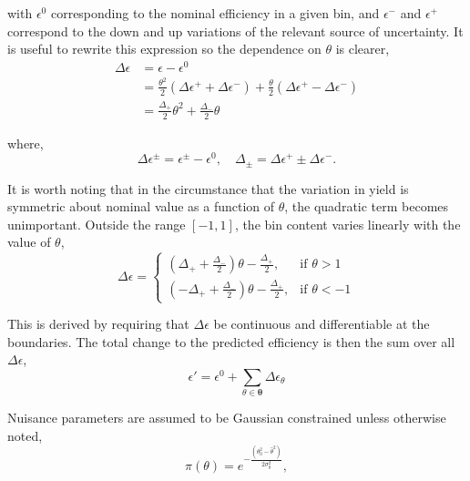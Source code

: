 with $\epsilon^{0}$ corresponding to the nominal efficiency in a given
bin, and $\epsilon^{-}$ and $\epsilon^{+}$ correspond to the down and up
variations of the relevant source of uncertainty.  It is useful to
rewrite this expression so the dependence on $\theta$ is clearer,
\begin{align}
    \Delta\epsilon &= \epsilon - \epsilon^{0} \\
     &= \frac{\theta^{2}}{2}(\Delta\epsilon^{+} + \Delta\epsilon^{-}) 
     + \frac{\theta}{2}(\Delta\epsilon^{+} - \Delta\epsilon^{-}) \\
     &= \frac{\Delta_{+}}{2}\theta^{2}  + \frac{\Delta_{-}}{2}\theta
\end{align}

where,
\begin{equation}
    \Delta\epsilon^{\pm} = \epsilon^{\pm} - \epsilon^{0}, \quad \Delta_{\pm} = \Delta\epsilon^{+} \pm \Delta\epsilon^{-} .
\end{equation}

It is worth noting that in the circumstance that the variation in yield
is symmetric about nominal value as a function of $\theta$, the
quadratic term becomes unimportant.  Outside the range $[-1, 1]$, the
bin content varies linearly with the value of $\theta$,
\begin{equation}
    \Delta\epsilon = 
    \begin{cases}
            (\Delta_{+} + \frac{\Delta_{-}}{2})\theta - \frac{\Delta_{+}}{2},
            & \text{if } \theta > 1 \\
            (-\Delta_{+} + \frac{\Delta_{-}}{2})\theta - \frac{\Delta_{+}}{2},
            & \text{if } \theta < -1
    \end{cases}
\end{equation}

This is derived by requiring that $\Delta\epsilon$ be continuous and
differentiable at the boundaries.  The total change to the predicted
efficiency is then the sum over all $\Delta\epsilon$, 
\begin{equation}
    \epsilon' = \epsilon^{0} + \sum_{\theta\in\boldsymbol{\theta}}\Delta\epsilon_{\theta}
\end{equation}

Nuisance parameters are assumed to be Gaussian constrained unless
otherwise noted,
\begin{equation}
    \pi(\theta) = e^{-\frac{(\theta_{0}^{2} -
    \hat{\theta}^{2})}{2\sigma_{\theta}^{2}}},
\end{equation}

